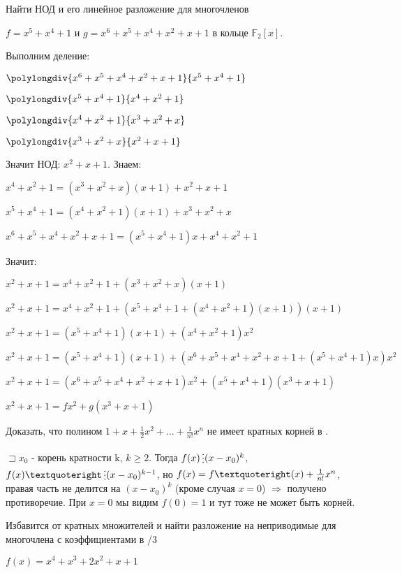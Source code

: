 \documentclass[12pt]{article}
\newenvironment{problem}[2][Problem]
{\begin{trivlist}\item[{\bfseries #1} {\bfseries #2.}]}{\end{trivlist}}
\newenvironment{solutions}[2][Solutions]
{\begin{trivlist}\item[{\bfseries #1} {\bfseries #2.}]}{\end{trivlist}}
\begin{document}
\begin{problem}{1} 
Найти НОД и его линейное разложение для многочленов 

$f=x^5+x^4+1$ и $g=x^6+x^5+x^4+x^2+x+1$ в кольце $\mathds{F}_2[x]$.
\end{problem}

\begin{solutions}{1} Выполним деление:

$\polylongdiv{x^6+x^5+x^4+x^2+x+1}{x^5+x^4+1}$

$\polylongdiv{x^5+x^4+1}{x^4+x^2+1}$

$\polylongdiv{x^4+x^2+1}{x^3+x^2+x}$

$\polylongdiv{x^3+x^2+x}{x^2+x+1}$

Значит НОД: $x^2+x+1$. Знаем: 

$x^4+x^2+1 =  (x^3+x^2+x)(x+1) + x^2+x+1$

$x^5+x^4+1 = (x^4+x^2+1)(x+1) + x^3+x^2+x$

$x^6+x^5+x^4+x^2+x+1 = (x^5+x^4+1)x + x^4+x^2+1$

Значит:

$x^2+x+1 = x^4+x^2+1 + (x^3+x^2+x)(x+1)$

$x^2+x+1 = x^4+x^2+1 + (x^5+x^4+1 + (x^4+x^2+1)(x+1))(x+1)$

$x^2+x+1 = (x^5+x^4+1)(x+1) + (x^4+x^2+1)x^2$

$x^2+x+1 = (x^5+x^4+1)(x+1) + (x^6+x^5+x^4+x^2+x+1 + (x^5+x^4+1)x)x^2$

$x^2+x+1 = (x^6+x^5+x^4+x^2+x+1)x^2 + (x^5+x^4+1)(x^3+x+1)$

$x^2+x+1 = f x^2 + g (x^3+x+1)$
\end{solutions}

\begin{problem}{2} 
Доказать, что полином $1+x+\frac{1}{2}x^2+...+\frac{1}{n!}x^n$ не имеет кратных корней в .
\end{problem}

\begin{solutions}{2} 
$\sqsupset x_0$ - корень кратности k, $k \geqslant 2$. Тогда $f(x) \mathop{\raisebox{-2pt}{\vdots}} (x-x_0)^k$, $f(x)\textquoteright \mathop{\raisebox{-2pt}{\vdots}} (x-x_0)^{k-1}$, но $f(x)=f\textquoteright(x) + \frac{1}{n!}x^n$, правая часть не делится на $(x-x_0)^k$ (кроме случая $x=0$) $\Rightarrow$ получено противоречие.
При $x=0$ мы видим $f(0)=1$ и тут тоже не может быть корней.
\end{solutions}

\begin{problem}{3} 
Избавится от кратных множителей и найти разложение на неприводимые для многочлена с коэффициентами в /3 
\begin{center}
$f(x) = x^4+x^3+2x^2+x+1$
\end{center}
\end{problem}
\end{document}
